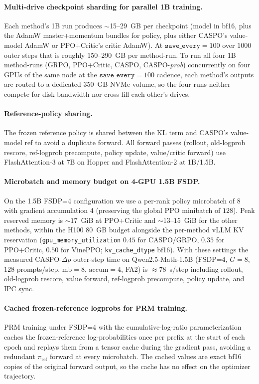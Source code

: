 \documentclass[11pt]{article}
\newcommand{\caspo}{\textsc{CASPO}}
\newcommand{\ppocritic}{PPO+Critic}
\newcommand{\grpo}{GRPO}
\newcommand{\vineppo}{VinePPO}
\begin{document}
\paragraph{Multi-drive checkpoint sharding for parallel 1B training.}
Each method's 1B run produces $\sim$15--29~GB per checkpoint
(model in bf16, plus the AdamW master+momentum bundles for policy, plus
either \caspo{}'s value-model AdamW or \ppocritic{}'s critic AdamW). At
$\mathtt{save\_every}{=}100$ over 1000 outer steps that is roughly
150--290~GB per method-run. To run all four 1B method-runs (\grpo{},
\ppocritic{}, \caspo{}, \caspo{}-\emph{prob}) concurrently on four GPUs of
the same node at the $\mathtt{save\_every}{=}100$ cadence, each method's
outputs are routed to a dedicated 350~GB NVMe volume, so the four runs
neither compete for disk bandwidth nor cross-fill each other's drives.

\paragraph{Reference-policy sharing.}
The frozen reference policy is shared between the KL term and \caspo{}'s
value-model ref to avoid a duplicate forward. All forward passes
(rollout, old-logprob rescore, ref-logprob precompute, policy update,
value/critic forward) use FlashAttention-3 at 7B on Hopper and
FlashAttention-2 at 1B/1.5B.

\paragraph{Microbatch and memory budget on 4-GPU 1.5B FSDP.}
On the 1.5B FSDP=4 configuration we use a per-rank policy microbatch
of $8$ with gradient accumulation $4$ (preserving the global PPO
minibatch of $128$). Peak reserved memory is ${\sim}17$~GiB at
\ppocritic{} and ${\sim}13\text{--}15$~GiB for the other methods,
within the H100 80~GB budget alongside the per-method vLLM KV
reservation (\texttt{gpu\_memory\_utilization} $0.45$ for
\caspo{}/\grpo{}, $0.35$ for \ppocritic{}, $0.50$ for \vineppo{};
\texttt{kv\_cache\_dtype} bf16). With these settings the measured
\caspo{}-$\Delta p$ outer-step time on Qwen2.5-Math-1.5B (FSDP=4,
$G{=}8$, $128$ prompts/step, $\mathrm{mb}{=}8$, $\mathrm{accum}{=}4$,
FA2) is ${\approx}78$~s/step including rollout, old-logprob
rescore, value forward, ref-logprob precompute, policy update, and
IPC sync.

\paragraph{Cached frozen-reference logprobs for PRM training.}
PRM training under FSDP=4 with the cumulative-log-ratio
parameterization caches the frozen-reference log-probabilities once
per prefix at the start of each epoch and replays them from a tensor
cache during the gradient pass, avoiding a redundant
$\pi_{\mathrm{ref}}$ forward at every microbatch. The cached values
are exact bf16 copies of the original forward output, so the cache
has no effect on the optimizer trajectory.
\end{document}
